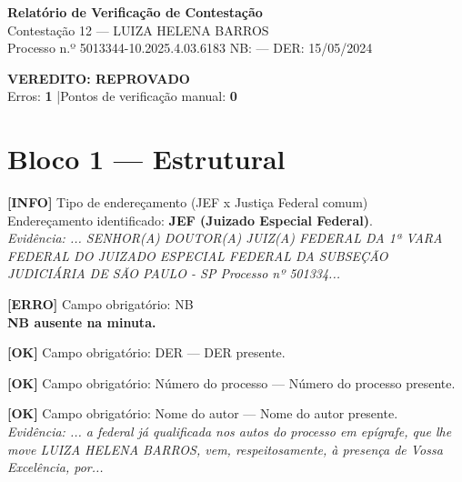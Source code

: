 \documentclass[12pt,a4paper]{article}
\newcommand{\statusOK}[1]{\textcolor{corOK}{\textbf{[OK]}} #1}
\newcommand{\statusERRO}[1]{\textcolor{corERRO}{\textbf{[ERRO]}} #1}
\newcommand{\statusINFO}[1]{\textcolor{corINFO}{\textbf{[INFO]}} #1}
\begin{document}
\begin{center}
  {\LARGE \textbf{Relatório de Verificação de Contestação}}\\[0.4em]
  {\large Contestação 12 --- LUIZA HELENA BARROS}\\[0.2em]
  {\small Processo n.º 5013344-10.2025.4.03.6183 \quad NB: — \quad DER: 15/05/2024}
\end{center}

\vspace{0.5em}

\noindent\colorbox{corFundoReprovado}{%
  \begin{minipage}{\dimexpr\linewidth-2\fboxsep}
    \centering
    \vspace{0.3em}
    {\large \textcolor{corERRO}{\textbf{VEREDITO: REPROVADO}}}\\
    Erros: \textbf{1} \quad|\quad Pontos de verificação manual: \textbf{0}
    \vspace{0.3em}
  \end{minipage}%
}

\vspace{1em}


\section{Bloco 1 --- Estrutural}

\statusINFO{Tipo de endereçamento (JEF x Justiça Federal comum)}\\
Endereçamento identificado: \textbf{JEF (Juizado Especial Federal)}.\\
\textit{Evidência: ... SENHOR(A) DOUTOR(A) JUIZ(A) FEDERAL DA 1ª VARA FEDERAL DO JUIZADO ESPECIAL FEDERAL DA SUBSEÇÃO JUDICIÁRIA DE SÃO PAULO - SP Processo nº 501334...}

\medskip
\statusERRO{Campo obrigatório: NB}\\
\textbf{NB ausente na minuta.}

\medskip
\statusOK{Campo obrigatório: DER} --- DER presente.

\medskip
\statusOK{Campo obrigatório: Número do processo} --- Número do processo presente.

\medskip
\statusOK{Campo obrigatório: Nome do autor} --- Nome do autor presente.\\
\textit{Evidência: ... a federal já qualificada nos autos do processo em epígrafe, que lhe move LUIZA HELENA BARROS, vem, respeitosamente, à presença de Vossa Excelência, por...}
\end{document}
